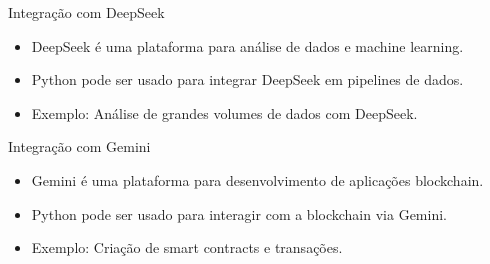\documentclass{beamer}
\begin{document}
\begin{frame}{Integração com DeepSeek}
\begin{itemize}
    \item DeepSeek é uma plataforma para análise de dados e machine learning.
    \item Python pode ser usado para integrar DeepSeek em pipelines de dados.
    \item Exemplo: Análise de grandes volumes de dados com DeepSeek.
\end{itemize}
   \centering
{}
\end{frame}

\begin{frame}{Integração com Gemini}
\begin{itemize}
    \item Gemini é uma plataforma para desenvolvimento de aplicações blockchain.
    \item Python pode ser usado para interagir com a blockchain via Gemini.
    \item Exemplo: Criação de smart contracts e transações.
\end{itemize}
   \centering
{}
\end{frame}
\end{document}
